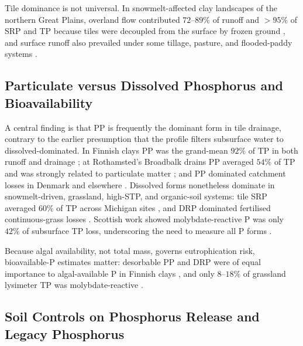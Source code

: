 Tile dominance is not universal. In snowmelt-affected clay landscapes of the
northern Great Plains, overland flow contributed $72$--$89\%$ of runoff and
$>95\%$ of SRP and TP because tiles were decoupled from the surface by
frozen ground \parencite{Kokulan2019b,Kokulan2021}, and surface runoff also
prevailed under some tillage, pasture, and flooded-paddy systems
\parencite{Zhao2001,Melland2008,DarziNaftchali2016}.

\subsection{Particulate versus Dissolved Phosphorus and Bioavailability}

A central finding is that PP is frequently the dominant form in tile
drainage, contrary to the earlier presumption that the profile filters
subsurface water to dissolved-dominated. In Finnish clays PP was the
grand-mean $92\%$ of TP in both runoff and drainage \parencite{Uusitalo2001};
at Rothamsted's Broadbalk drains PP averaged $54\%$ of TP and was strongly
related to particulate matter \parencite{Lu2003,Lu2004}; and PP dominated
catchment losses in Denmark and elsewhere
\parencite{Grant1996,Brendel2019,vanderSalm2012}. Dissolved forms
nonetheless dominate in snowmelt-driven, grassland, high-STP, and
organic-soil systems: tile SRP averaged $60\%$ of TP across Michigan sites
\parencite{Clement2017}, and DRP dominated fertilised continuous-grass
losses \parencite{Zhang2015b}. Scottish work showed molybdate-reactive P was
only $42\%$ of subsurface TP loss, underscoring the need to measure all P
forms \parencite{Hooda1999}.

Because algal availability, not total mass, governs eutrophication risk,
bioavailable-P estimates matter: desorbable PP and DRP were of equal
importance to algal-available P in Finnish clays
\parencite{Uusitalo2001,Uusitalo2003}, and only $8$--$18\%$ of grassland
lysimeter TP was molybdate-reactive \parencite{Bilotta2008}.

\subsection{Soil Controls on Phosphorus Release and Legacy Phosphorus}


